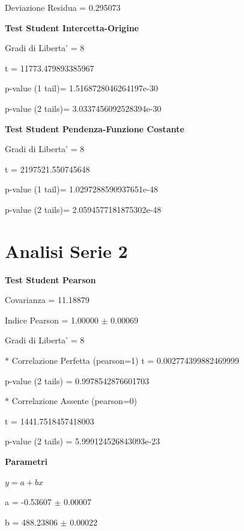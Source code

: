 \documentclass{article}
\begin{document}
Deviazione Residua = 0.295073

\textbf{Test Student Intercetta-Origine}

Gradi di Liberta' = 8

t = 11773.479893385967

p-value (1 tail)= 1.5168728046264197e-30

p-value (2 tails)= 3.0337456092528394e-30

\textbf{Test Student Pendenza-Funzione Costante}

Gradi di Liberta' = 8

t = 2197521.550745648

p-value (1 tail)= 1.0297288590937651e-48

p-value (2 tails)= 2.0594577181875302e-48

\section*{Analisi Serie 2}

\textbf{Test Student Pearson}

Covarianza = 11.18879

Indice Pearson = 1.00000 $\pm$ 0.00069

Gradi di Liberta' = 8

$\ast$ Correlazione Perfetta (pearson=1)
t = 0.002774399882469999

p-value (2 tails) = 0.9978542876601703

$\ast$ Correlazione Assente (pearson=0)

t = 1441.7518457418003

p-value (2 tails) = 5.999124526843093e-23

\textbf{Parametri}

$y = a + bx$

a = -0.53607 $\pm$ 0.00007

b = 488.23806 $\pm$ 0.00022
\end{document}
